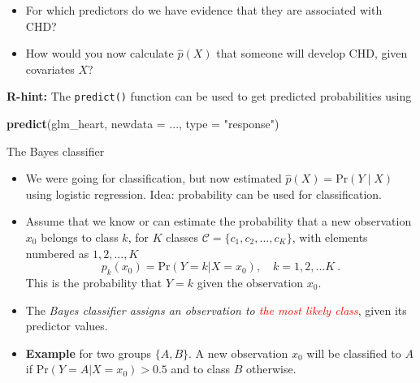 \documentclass[10pt,ignorenonframetext,]{beamer}
\newenvironment{Shaded}{\begin{snugshade}}{\end{snugshade}}
\newcommand{\DataTypeTok}[1]{\textcolor[rgb]{0.13,0.29,0.53}{#1}}
\newcommand{\KeywordTok}[1]{\textcolor[rgb]{0.13,0.29,0.53}{\textbf{#1}}}
\newcommand{\NormalTok}[1]{#1}
\newcommand{\StringTok}[1]{\textcolor[rgb]{0.31,0.60,0.02}{#1}}
\providecommand{\tightlist}{%
  \setlength{\itemsep}{0pt}\setlength{\parskip}{0pt}}
\begin{document}
\begin{frame}[fragile]

\begin{itemize}
\item
  For which predictors do we have evidence that they are associated with
  CHD?
\item
  How would you now calculate \(\hat{p}(X)\) that someone will develop
  CHD, given covariates \(X\)?
\end{itemize}

\vspace{5mm}

\textbf{R-hint:} The \texttt{predict()} function can be used to get
predicted probabilities using

\scriptsize

\begin{Shaded}
\begin{Highlighting}[]
\KeywordTok{predict}\NormalTok{(glm_heart, }\DataTypeTok{newdata =}\NormalTok{ ..., }\DataTypeTok{type =} \StringTok{"response"}\NormalTok{)}
\end{Highlighting}
\end{Shaded}

\end{frame}

\begin{frame}{The Bayes classifier}
\protect\hypertarget{the-bayes-classifier}{}

\begin{itemize}
\tightlist
\item
  We were going for classification, but now estimated
  \(\hat{p}(X)=\text{Pr}(Y \mid X)\) using logistic regression. Idea:
  probability can be used for classification.
\end{itemize}

\vspace{0mm}

\begin{itemize}
\item
  Assume that we know or can estimate the probability that a new
  observation \(x_0\) belongs to class \(k\), for \(K\) classes
  \(\mathcal{C} = \{c_1, c_2,\ldots, c_K\}\), with elements numbered as
  \(1, 2, ..., K\)
  \[p_k(x_0) = \text{Pr}(Y=k | X=x_0), \quad k = 1, 2, ... K \ .\] This
  is the probability that \(Y=k\) given the observation \(x_0\).
  \vspace{1mm}
\item
  The \emph{Bayes classifier assigns an observation to
  \textcolor{red}{the most likely class}}, given its predictor values.
\item
  \textbf{Example} for two groups \(\{A, B\}\). A new observation
  \(x_0\) will be classified to \(A\) if
  \(\text{Pr}(Y=A | X=x_0) > 0.5\) and to class \(B\) otherwise.
\end{itemize}

\end{frame}
\end{document}
